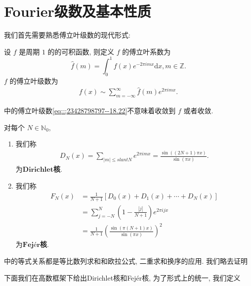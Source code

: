 \documentclass[../../main.tex]{subfiles}
\begin{document}
\section{Fourier级数及基本性质}

我们首先需要熟悉傅立叶级数的现代形式:

\begin{definition}\label{definition:定义18.2}
设 $f$ 是周期 $1$ 的的可积函数, 则定义 $f$ 的傅立叶系数为
\[
\hat{f}(m) = \int_{0}^{1} f(x) e^{-2\pi i m x} \mathrm{d}x, m \in \mathbb{Z}.
\]
$f$ 的傅立叶级数为
\begin{align*}
f(x) \sim \sum_{m = -\infty}^{\infty} \hat{f}(m) e^{2\pi i m x}.
\end{align*}
\end{definition}
\begin{remark}
中的傅立叶级数\eqref{eq::;23428798797--18.22}不意味着收敛到 $f$ 或者收敛.
\end{remark}

\begin{definition}\label{definition:定义18.3}
对每个 $N \in \mathbb{N}_0$,
\begin{enumerate}
\item 我们称
\begin{align*}
D_N(x) = \sum_{|m| \leqslant slant N} e^{2\pi i m x} = \frac{\sin((2N + 1)\pi x)}{\sin(\pi x)}. 
\end{align*}
为$\mathbf{Dirichlet}$\textbf{核}.

\item 我们称
\begin{align*}
F_N(x) &= \frac{1}{N + 1}[D_0(x) + D_1(x) + \cdots + D_N(x)] \\
&= \sum_{j = -N}^{N} \left(1 - \frac{|j|}{N + 1}\right) e^{2\pi i j x} \\
&= \frac{1}{N + 1} \left( \frac{\sin(\pi (N + 1) x)}{\sin(\pi x)} \right)^2
\end{align*}
为$\mathbf{Fejér}$\textbf{核}.
\end{enumerate}
\end{definition}
\begin{remark}
中的等式关系都是等比数列求和和欧拉公式, 二重求和换序的应用. 我们略去证明
\end{remark}

下面我们在高数框架下给出Dirichlet核和Fejér核, 为了形式上的统一, 我们定义
\end{document}
